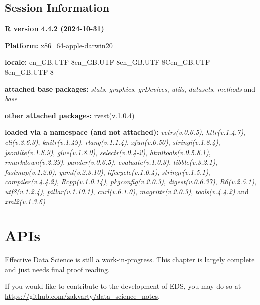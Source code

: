 \documentclass[
  letterpaper,
  DIV=11,
  numbers=noendperiod]{scrreprt}
\begin{document}
\section{Session Information}\label{session-information-4}

\textbf{R version 4.4.2 (2024-10-31)}

\textbf{Platform:} x86\_64-apple-darwin20

\textbf{locale:}
en\_GB.UTF-8\textbar\textbar en\_GB.UTF-8\textbar\textbar en\_GB.UTF-8\textbar\textbar C\textbar\textbar en\_GB.UTF-8\textbar\textbar en\_GB.UTF-8

\textbf{attached base packages:} \emph{stats}, \emph{graphics},
\emph{grDevices}, \emph{utils}, \emph{datasets}, \emph{methods} and
\emph{base}

\textbf{other attached packages:} rvest(v.1.0.4)

\textbf{loaded via a namespace (and not attached):}
\emph{vctrs(v.0.6.5)}, \emph{httr(v.1.4.7)}, \emph{cli(v.3.6.3)},
\emph{knitr(v.1.49)}, \emph{rlang(v.1.1.4)}, \emph{xfun(v.0.50)},
\emph{stringi(v.1.8.4)}, \emph{jsonlite(v.1.8.9)}, \emph{glue(v.1.8.0)},
\emph{selectr(v.0.4-2)}, \emph{htmltools(v.0.5.8.1)},
\emph{rmarkdown(v.2.29)}, \emph{pander(v.0.6.5)},
\emph{evaluate(v.1.0.3)}, \emph{tibble(v.3.2.1)},
\emph{fastmap(v.1.2.0)}, \emph{yaml(v.2.3.10)},
\emph{lifecycle(v.1.0.4)}, \emph{stringr(v.1.5.1)},
\emph{compiler(v.4.4.2)}, \emph{Rcpp(v.1.0.14)},
\emph{pkgconfig(v.2.0.3)}, \emph{digest(v.0.6.37)}, \emph{R6(v.2.5.1)},
\emph{utf8(v.1.2.4)}, \emph{pillar(v.1.10.1)}, \emph{curl(v.6.1.0)},
\emph{magrittr(v.2.0.3)}, \emph{tools(v.4.4.2)} and \emph{xml2(v.1.3.6)}

\chapter{APIs}\label{data-apis}

\begin{tcolorbox}[enhanced jigsaw, coltitle=black, opacityback=0, left=2mm, titlerule=0mm, breakable, colback=white, opacitybacktitle=0.6, colbacktitle=quarto-callout-note-color!10!white, bottomtitle=1mm, toptitle=1mm, colframe=quarto-callout-note-color-frame, bottomrule=.15mm, leftrule=.75mm, title=\textcolor{quarto-callout-note-color}{\faInfo}\hspace{0.5em}{Note}, toprule=.15mm, arc=.35mm, rightrule=.15mm]

Effective Data Science is still a work-in-progress. This chapter is
largely complete and just needs final proof reading.

If you would like to contribute to the development of EDS, you may do so
at \url{https://github.com/zakvarty/data_science_notes}.

\end{tcolorbox}
\end{document}
